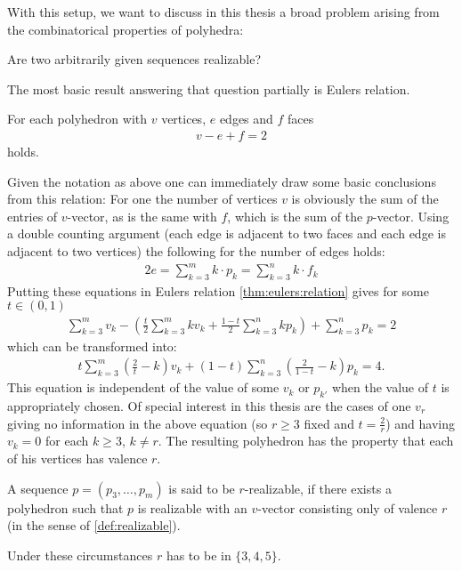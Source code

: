With this setup, we want to discuss in this thesis a broad problem arising from the combinatorical properties of polyhedra:
\begin{problem} Are two arbitrarily given sequences realizable?
\end{problem}
The most basic result answering that question partially is Eulers relation.
\begin{theorem}\label{thm:eulers:relation}
  For each polyhedron with $v$ vertices, $e$ edges and $f$ faces
  \begin{align*}
    v - e + f = 2
  \end{align*}
  holds.
\end{theorem}
Given the notation as above one can immediately draw some basic conclusions from this relation: For one the number of vertices $v$ is obviously the sum of the entries of $v$-vector, as is the same with $f$, which is the sum of the $p$-vector. Using a double counting argument (each edge is adjacent to two faces and each edge is adjacent to two vertices) the following for the number of edges holds:
\begin{align*}
  2e = \sum_{k=3}^{m} k \cdot p_k = \sum_{k=3}^{n} k \cdot f_k
\end{align*}
Putting these equations in Eulers relation \autoref{thm:eulers:relation} gives for some $t \in (0, 1)$
\begin{align*}
  \sum_{k=3}^m v_k - \left(\frac{t}{2} \sum_{k=3}^m k v_k + \frac{1-t}{2} \sum_{k=3}^n k p_k \right) + \sum_{k=3}^n p_k = 2
\end{align*}
which can be transformed into:
\begin{align}
  t \sum_{k=3}^m \left(\frac{2}{t} - k \right) v_k + (1-t) \sum_{k=3}^n \left( \frac{2}{1-t} - k \right) p_k = 4. \label{eq:general:vp:relation}
\end{align}
This equation is independent of the value of some $v_k$ or $p_{k'}$ when the value of $t$ is appropriately chosen. Of special interest in this thesis are the cases of one $v_r$ giving no information in the above equation (so $r \geq 3$ fixed and $t = \frac{2}{r}$) and having $v_{k} = 0$ for each $k \geq 3$, $k \neq r$. The resulting polyhedron has the property that each of his vertices has valence $r$. 
\begin{definition}[$r$-realizable]\label{def:r:realizable}
  A sequence $p = (p_3, \dots, p_m)$ is said to be $r$-realizable, if there exists a polyhedron such that $p$ is realizable with an $v$-vector consisting only of valence $r$ (in the sense of \autoref{def:realizable}).
\end{definition}
Under these circumstances $r$ has to be in $\{3, 4, 5\}$.

